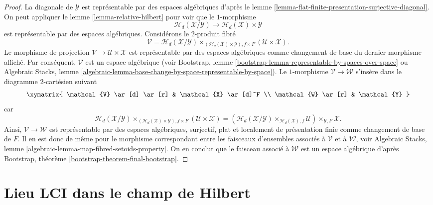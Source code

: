 \begin{proof}
\medskip\noindent
La diagonale de $\mathcal{Y}$ est représentable par des espaces algébriques d'après le
lemme \ref{lemma-flat-finite-presentation-surjective-diagonal}.
On peut appliquer le
lemme \ref{lemma-relative-hilbert}
pour voir que le $1$-morphisme
$$
\mathcal{H}_d(\mathcal{X}/\mathcal{Y})
\longrightarrow
\mathcal{H}_d(\mathcal{X}) \times \mathcal{Y}
$$
est représentable par des espaces algébriques. Considérons le $2$-produit fibré
$$
\mathcal{V} =
\mathcal{H}_d(\mathcal{X}/\mathcal{Y})
\times_{(\mathcal{H}_d(\mathcal{X}) \times \mathcal{Y}), f \times F}
(\mathcal{U} \times \mathcal{X}).
$$
Le morphisme de projection $\mathcal{V} \to \mathcal{U} \times \mathcal{X}$
est représentable par des espaces algébriques comme changement de base du dernier
morphisme affiché. Par conséquent, $\mathcal{V}$ est un espace algébrique (voir
Bootstrap, lemme \ref{bootstrap-lemma-representable-by-spaces-over-space}
ou
Algebraic Stacks,
lemme \ref{algebraic-lemma-base-change-by-space-representable-by-space}).
Le $1$-morphisme $\mathcal{V} \to \mathcal{W}$ s'insère dans le diagramme
$2$-cartésien suivant
$$
\xymatrix{
\mathcal{V} \ar[d] \ar[r] & \mathcal{X} \ar[d]^F \\
\mathcal{W} \ar[r] & \mathcal{Y}
}
$$
car
$$
\mathcal{H}_d(\mathcal{X}/\mathcal{Y})
\times_{(\mathcal{H}_d(\mathcal{X}) \times \mathcal{Y}), f \times F}
(\mathcal{U} \times \mathcal{X})
=
(\mathcal{H}_d(\mathcal{X}/\mathcal{Y})
\times_{\mathcal{H}_d(\mathcal{X}), f}
\mathcal{U}) \times_{\mathcal{Y}, F} \mathcal{X}.
$$
Ainsi, $\mathcal{V} \to \mathcal{W}$ est représentable par des espaces algébriques,
surjectif, plat et localement de présentation finie comme changement de base
de $F$. Il en est donc de même pour le morphisme correspondant entre les faisceaux
d'ensembles associés à $\mathcal{V}$ et à $\mathcal{W}$, voir
Algebraic Stacks, lemme \ref{algebraic-lemma-map-fibred-setoids-property}.
On en conclut que le faisceau associé à $\mathcal{W}$ est un espace
algébrique d'après
Bootstrap, théorème \ref{bootstrap-theorem-final-bootstrap}.
\end{proof}




\section{Lieu LCI dans le champ de Hilbert}
\label{section-lci}

